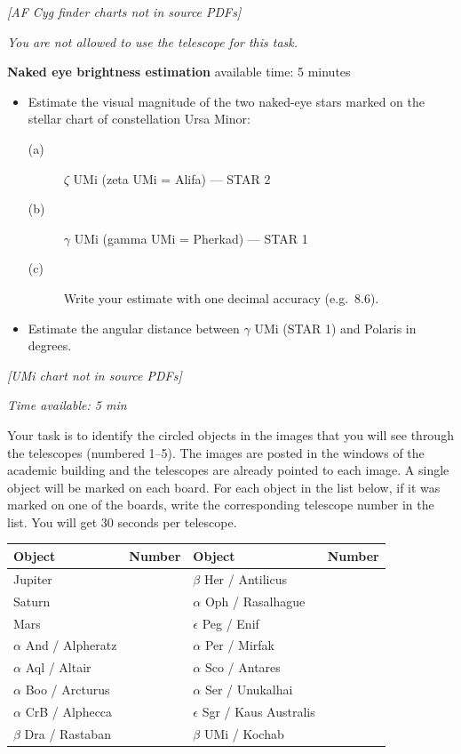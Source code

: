 \textit{[AF Cyg finder charts not in source PDFs]}

\emph{You are not allowed to use the telescope for this task.}

\textbf{Naked eye brightness estimation} \hfill available time: 5 minutes

\begin{itemize}
\item Estimate the visual magnitude of the two naked-eye stars marked on the
  stellar chart of constellation Ursa Minor:
  \begin{description}
  \item[(a)] $\zeta$ UMi (zeta UMi = Alifa) --- STAR 2
  \item[(b)] $\gamma$ UMi (gamma UMi = Pherkad) --- STAR 1
  \item[(c)] Write your estimate with one decimal accuracy (e.g.\ 8.6).
  \end{description}
\item Estimate the angular distance between $\gamma$ UMi (STAR 1) and
  Polaris in degrees.
\end{itemize}

\textit{[UMi chart not in source PDFs]}

\emph{Time available: 5 min}

Your task is to identify the circled objects in the images that you will see
through the telescopes (numbered 1--5). The images are posted in the windows
of the academic building and the telescopes are already pointed to each
image. A single object will be marked on each board. For each object in the
list below, if it was marked on one of the boards, write the corresponding
telescope number in the list. You will get 30 seconds per telescope.

\begin{center}
\begin{tabular}{lc|lc}
Object & Number & Object & Number \\
\hline
Jupiter & & $\beta$ Her / Antilicus & \\
Saturn & & $\alpha$ Oph / Rasalhague & \\
Mars & & $\epsilon$ Peg / Enif & \\
$\alpha$ And / Alpheratz & & $\alpha$ Per / Mirfak & \\
$\alpha$ Aql / Altair & & $\alpha$ Sco / Antares & \\
$\alpha$ Boo / Arcturus & & $\alpha$ Ser / Unukalhai & \\
$\alpha$ CrB / Alphecca & & $\epsilon$ Sgr / Kaus Australis & \\
$\beta$ Dra / Rastaban & & $\beta$ UMi / Kochab & \\
\end{tabular}
\end{center}

